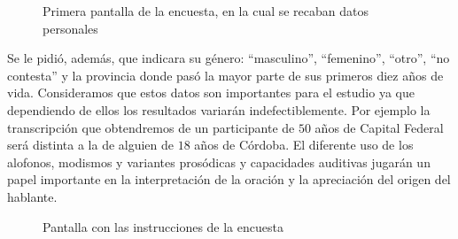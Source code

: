 \begin{figure}[htp]
\begin{center}
\end{center}
\caption{Primera pantalla de la encuesta, en la cual se recaban datos personales}
\label{personalData}
\end{figure}

Se le pidió, además, que indicara su género: ``masculino'', ``femenino'', ``otro'', ``no contesta'' y la provincia donde pasó la mayor parte de sus primeros diez años de vida. Consideramos que estos datos son importantes para el estudio ya que dependiendo de ellos los resultados variarán indefectiblemente. Por ejemplo la transcripción que obtendremos de un participante de $50$ años de Capital Federal será distinta a la de alguien de $18$ años de Córdoba. El diferente uso de los alofonos, modismos y variantes prosódicas y capacidades auditivas jugarán un papel importante en la interpretación de la oración y la apreciación del origen del hablante.

\begin{figure}
\begin{center}
\end{center}
\caption{Pantalla con las instrucciones de la encuesta}
\label{instrucciones}
\end{figure}

